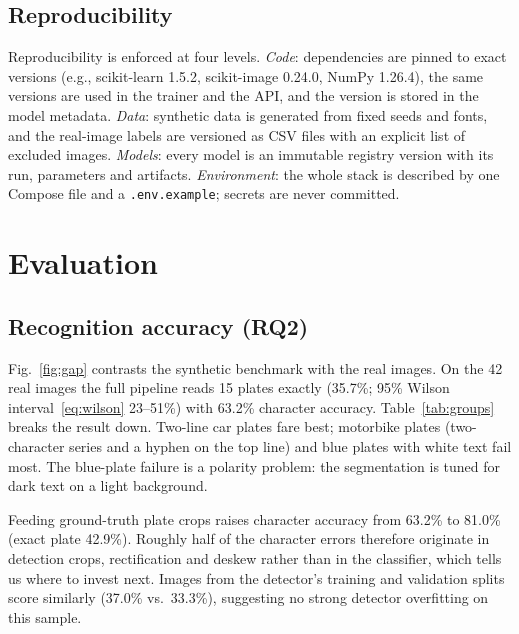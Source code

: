 \documentclass[conference]{IEEEtran}
\newcommand{\code}[1]{\texttt{#1}}
\begin{document}
\subsection{Reproducibility}
Reproducibility is enforced at four levels. \emph{Code}: dependencies are pinned
to exact versions (e.g., scikit-learn 1.5.2, scikit-image 0.24.0, NumPy 1.26.4),
the same versions are used in the trainer and the API, and the version is stored
in the model metadata. \emph{Data}: synthetic data is generated from fixed seeds
and fonts, and the real-image labels are versioned as CSV files with an explicit
list of excluded images. \emph{Models}: every model is an immutable registry
version with its run, parameters and artifacts. \emph{Environment}: the whole
stack is described by one Compose file and a \code{.env.example}; secrets are
never committed.

\section{Evaluation}\label{sec:eval}
\subsection{Recognition accuracy (RQ2)}
Fig.~\ref{fig:gap} contrasts the synthetic benchmark with the real images. On the
42 real images the full pipeline reads 15 plates exactly (35.7\%; 95\% Wilson
interval~\eqref{eq:wilson} 23--51\%) with 63.2\% character accuracy.
Table~\ref{tab:groups} breaks the result down. Two-line car plates fare best;
motorbike plates (two-character series and a hyphen on the top line) and blue
plates with white text fail most. The blue-plate failure is a polarity problem:
the segmentation is tuned for dark text on a light background.

Feeding ground-truth plate crops raises character accuracy from 63.2\% to
81.0\% (exact plate 42.9\%). Roughly half of the character errors therefore
originate in detection crops, rectification and deskew rather than in the
classifier, which tells us where to invest next. Images from the detector's
training and validation splits score similarly (37.0\% vs.\ 33.3\%), suggesting
no strong detector overfitting on this sample.
\end{document}
